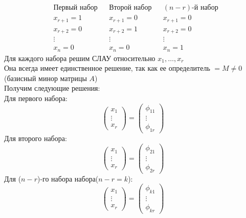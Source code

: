\documentclass[a4paper,12pt]{article}
\begin{document}
    \begin{align*}
        &\text{Первый набор}&&\text{Второй набор}&&(n-r)\text{-й набор}\\
        &x_{r+1}=1&&x_{r+1}=0&&x_{r+1}=0\\
        &x_{r+2}=0&&x_{r+2}=1&&x_{r+2}=0\\
        &\vdots&&\vdots&&\vdots\\
        &x_{n}=0&&x_{n}=0&&x_{n}=1
    \end{align*}
    Для каждого набора решим СЛАУ относительно $x_1, \ldots, x_r$\\
    Она всегда имеет единственное решение, так как ее определитель $=M\ne0$ (базисный минор матрицы $A$)\\
    Получим следующие решения:\\
    Для первого набора:
    \[
        \begin{pmatrix}
            x_1    \\
            \vdots \\
            x_r
        \end{pmatrix}=\begin{pmatrix}
                          \phi_{11} \\
                          \vdots    \\
                          \phi_{1r}
        \end{pmatrix}
    \]
    Для второго набора:
    \[
        \begin{pmatrix}
            x_1    \\
            \vdots \\
            x_r
        \end{pmatrix}=\begin{pmatrix}
                          \phi_{21} \\
                          \vdots    \\
                          \phi_{2r}
        \end{pmatrix}
    \]
    Для ($n-r$)-го набора набора($n-r=k$):
    \[
        \begin{pmatrix}
            x_1    \\
            \vdots \\
            x_r
        \end{pmatrix}=\begin{pmatrix}
                          \phi_{k1} \\
                          \vdots    \\
                          \phi_{kr}
        \end{pmatrix}
    \]
\end{document}
